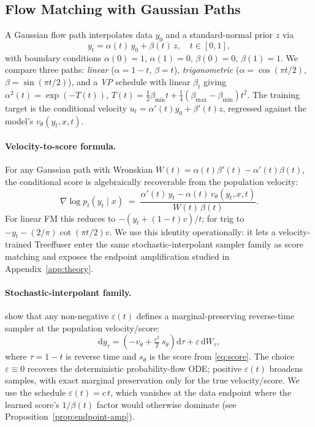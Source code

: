 \documentclass{tpm2026}
\newcommand{\dd}{\mathrm{d}}
\begin{document}
\subsection{Flow Matching with Gaussian Paths}\label{sec:fm}
A Gaussian flow path interpolates data $y_0$ and a standard-normal prior $z$ via
\begin{equation}\label{eq:path}
y_t = \alpha(t)\, y_0 + \beta(t)\, z, \quad t \in [0,1],
\end{equation}
with boundary conditions $\alpha(0)=1$, $\alpha(1)=0$, $\beta(0)=0$, $\beta(1)=1$. We compare three paths: \emph{linear} ($\alpha = 1-t$, $\beta = t$), \emph{trigonometric} ($\alpha = \cos(\pi t/2)$, $\beta = \sin(\pi t /2)$), and a \emph{VP} schedule with linear $\beta_t$ giving $\alpha^2(t) = \exp(-T(t))$, $T(t) = \tfrac{1}{2}\beta_{\min} t + \tfrac{1}{4}(\beta_{\max} - \beta_{\min}) t^2$. The training target is the conditional velocity $u_t = \alpha'(t) y_0 + \beta'(t) z$, regressed against the model's $v_\theta(y_t, x, t)$.

\paragraph{Velocity-to-score formula.} For any Gaussian path with Wronskian $W(t) = \alpha(t) \beta'(t) - \alpha'(t) \beta(t)$, the conditional score is algebraically recoverable from the population velocity:
\begin{equation}\label{eq:score}
\nabla \log p_t(y_t \mid x) \;=\; \frac{\alpha'(t)\, y_t - \alpha(t)\, v_\theta(y_t, x, t)}{W(t)\,\beta(t)}.
\end{equation}
For linear FM this reduces to $-(y_t + (1-t) v)/t$; for trig to $-y_t - (2/\pi)\cot(\pi t/2) v$.
We use this identity operationally: it lets a velocity-trained Treeffuser enter the same stochastic-interpolant sampler family as score matching and exposes the endpoint amplification studied in Appendix~\ref{app:theory}.

\paragraph{Stochastic-interpolant family.} \citet{albergo2023stochastic} show that any non-negative $\varepsilon(t)$ defines a marginal-preserving reverse-time sampler at the population velocity/score:
\begin{equation}\label{eq:sde}
\dd y_\tau = \left(-v_\theta + \tfrac{\varepsilon^2}{2}\, s_\theta\right) \dd \tau + \varepsilon\, \dd W_\tau,
\end{equation}
where $\tau = 1 - t$ is reverse time and $s_\theta$ is the score from \eqref{eq:score}. The choice $\varepsilon \equiv 0$ recovers the deterministic probability-flow ODE; positive $\varepsilon(t)$ broadens samples, with exact marginal preservation only for the true velocity/score. We use the schedule $\varepsilon(t) = c\, t$, which vanishes at the data endpoint where the learned score's $1/\beta(t)$ factor would otherwise dominate (see Proposition~\ref{prop:endpoint-amp}).
\end{document}
